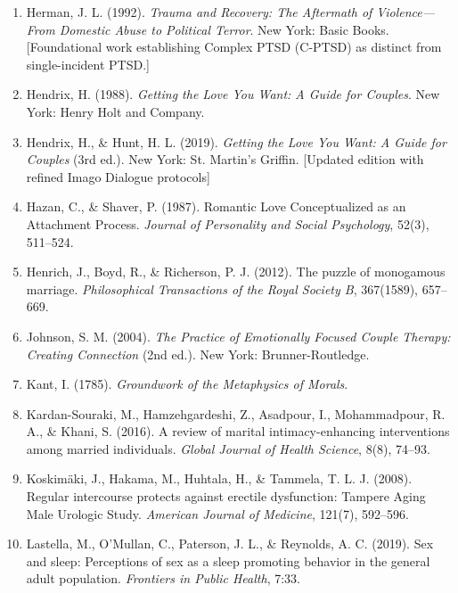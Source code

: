 \documentclass[12pt,openany]{book}
\numberwithin{equation}{chapter}
\begin{document}
\begin{enumerate}
    \item Herman, J. L. (1992). \textit{Trauma and Recovery: The Aftermath of Violence---From Domestic Abuse to Political Terror}. New York: Basic Books. [Foundational work establishing Complex PTSD (C-PTSD) as distinct from single-incident PTSD.]
    
    \item Hendrix, H. (1988). \textit{Getting the Love You Want: A Guide for Couples}. New York: Henry Holt and Company.
    
    \item Hendrix, H., \& Hunt, H. L. (2019). \textit{Getting the Love You Want: A Guide for Couples} (3rd ed.). New York: St. Martin's Griffin. [Updated edition with refined Imago Dialogue protocols]
    
    \item Hazan, C., \& Shaver, P. (1987). Romantic Love Conceptualized as an Attachment Process. \textit{Journal of Personality and Social Psychology}, 52(3), 511--524.
    
    \item Henrich, J., Boyd, R., \& Richerson, P. J. (2012). The puzzle of monogamous marriage. \textit{Philosophical Transactions of the Royal Society B}, 367(1589), 657--669.
    
    \item Johnson, S. M. (2004). \textit{The Practice of Emotionally Focused Couple Therapy: Creating Connection} (2nd ed.). New York: Brunner-Routledge.
    
    \item Kant, I. (1785). \textit{Groundwork of the Metaphysics of Morals}.
    
    \item Kardan-Souraki, M., Hamzehgardeshi, Z., Asadpour, I., Mohammadpour, R. A., \& Khani, S. (2016). A review of marital intimacy-enhancing interventions among married individuals. \textit{Global Journal of Health Science}, 8(8), 74--93.
    
    \item Koskimäki, J., Hakama, M., Huhtala, H., \& Tammela, T. L. J. (2008). Regular intercourse protects against erectile dysfunction: Tampere Aging Male Urologic Study. \textit{American Journal of Medicine}, 121(7), 592--596.
    
    \item Lastella, M., O'Mullan, C., Paterson, J. L., \& Reynolds, A. C. (2019). Sex and sleep: Perceptions of sex as a sleep promoting behavior in the general adult population. \textit{Frontiers in Public Health}, 7:33.
    

\end{enumerate}
\end{document}
